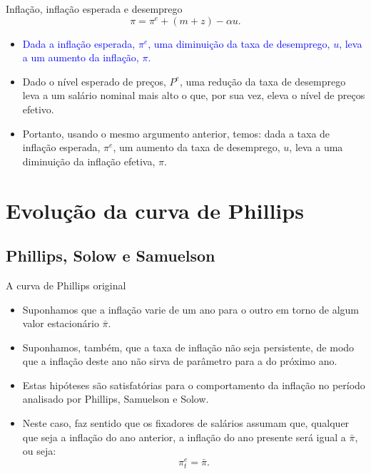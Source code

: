 \documentclass[10pt]{beamer}
\begin{document}
\begin{frame}{Inflação, inflação esperada e desemprego}
    \begin{equation*}
        \pi = \pi^e + (m + z) - \alpha u.
    \end{equation*}
    \bigskip
    \begin{itemize}
        \item \textcolor{blue}{Dada a inflação esperada, $\pi^e$, uma diminuição da taxa de desemprego, $u$, leva a um aumento da inflação, $\pi$.}
        \bigskip
        \item Dado o nível esperado de preços, $P^e$, uma redução da taxa de desemprego leva a um salário nominal mais alto o que, por sua vez, eleva o nível de preços efetivo.
        \bigskip
        \item Portanto, usando o mesmo argumento anterior, temos: dada a taxa de inflação esperada, $\pi^e$, um aumento da taxa de desemprego, $u$, leva a uma diminuição da inflação efetiva, $\pi$.
    \end{itemize}
\end{frame}

\section{Evolução da curva de Phillips}
\subsection{Phillips, Solow e Samuelson}
\begin{frame}{A curva de Phillips original}
    \begin{itemize}
        \item Suponhamos que a inflação varie de um ano para o outro em torno de algum valor estacionário $\bar{\pi}$.
        \bigskip
        \item Suponhamos, também, que a taxa de inflação não seja persistente, de modo que a inflação deste ano não sirva de parâmetro para a do próximo ano.
        \bigskip
        \item Estas hipóteses são satisfatórias para o comportamento da inflação no período analisado por Phillips, Samuelson e Solow.
        \bigskip
        \item Neste caso, faz sentido que os fixadores de salários assumam que, qualquer que seja a inflação do ano anterior, a inflação do ano presente será igual a $\bar{\pi}$, ou seja:
        \[
        \pi^e_t = \bar{\pi}.
        \]
    \end{itemize}
\end{frame}
\end{document}
